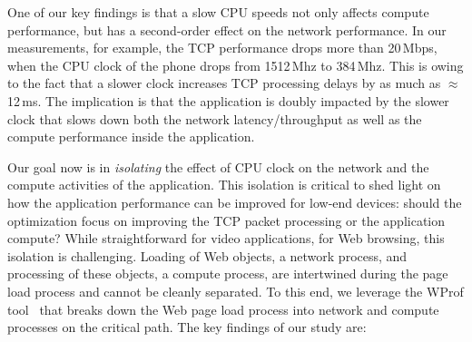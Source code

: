 One of our key findings is that a slow CPU speeds not only affects compute performance, but has a second-order effect on the network
performance. In our measurements, for example, the TCP performance drops more than 20\,Mbps, 
when the CPU clock of the phone drops from 1512\,Mhz to 384\,Mhz. This is owing to 
the fact that a slower clock
increases TCP processing delays by as much 
as $\approx$12\,ms.
The implication is that the application is doubly 
impacted by the slower clock that slows
down both the network latency/throughput as well as the compute 
performance inside the application. 

Our goal now is in {\em isolating} the effect of CPU clock on the network and the compute activities of the application. This isolation is critical to shed light on how the application 
performance can be improved for low-end devices: should the optimization focus on improving the TCP packet processing or the application compute? While straightforward for video applications, for Web browsing, this isolation is challenging.  
Loading of Web objects, a network process, and processing of these objects, a compute process, are intertwined during the page load process and cannot be cleanly separated. To this end, we leverage the WProf tool~\cite{wang2013demystifying,nejati2016depth} that breaks down the Web page load process into network and compute processes on the critical path. The key findings of our study are: %

